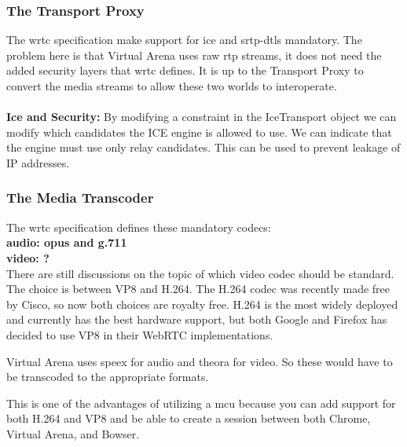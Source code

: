 \subsubsection{The Transport Proxy}
The \gls{wrtc} specification make support for \gls{ice} and \gls{srtp}-{dtls} mandatory. The problem here is that Virtual Arena uses raw \gls{rtp} streams, it does not need the added security layers that \gls{wrtc} defines. It is up to the Transport Proxy to convert the media streams to allow these two worlds to interoperate. 
\\
\\
\textbf{Ice and Security:}
By modifying a constraint in the IceTransport object we can modify which candidates the ICE engine is allowed to use. We can indicate that the engine must use only relay candidates. This can be used to prevent leakage of IP addresses.


\subsubsection{The Media Transcoder}
The \gls{wrtc} specification defines these mandatory codecs:
\\
\textbf{audio: opus and g.711}
\\
\textbf{video: ?}
\\
There are still discussions on the topic of which video codec should be standard. The choice is between VP8 and H.264. The H.264 codec was recently made free by Cisco, so now both choices are royalty free. H.264 is the most widely deployed and currently has the best hardware support, but both Google and Firefox has decided to use VP8 in their WebRTC implementations.

Virtual Arena uses speex for audio and theora for video. So these would have to be transcoded to the appropriate formats.

This is one of the advantages of utilizing a \gls{mcu} because you can add support for both H.264 and VP8 and be able to create a session between  both Chrome, Virtual Arena, and Bowser.